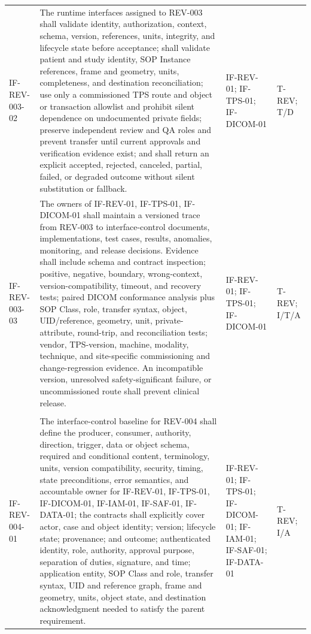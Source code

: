 \documentclass[11pt,letterpaper]{article}
\begin{document}
\begin{scriptsize}
\begin{longtable}{@{}L{0.14\textwidth}L{0.49\textwidth}L{0.19\textwidth}L{0.10\textwidth}@{}}
\addlinespace[2pt]
\mbox{IF-REV-003-02} & The runtime interfaces assigned to REV-003 shall validate identity, authorization, context, schema, version, references, units, integrity, and lifecycle state before acceptance; shall validate patient and study identity, SOP Instance references, frame and geometry, units, completeness, and destination reconciliation; use only a commissioned TPS route and object or transaction allowlist and prohibit silent dependence on undocumented private fields; preserve independent review and QA roles and prevent transfer until current approvals and verification evidence exist; and shall return an explicit accepted, rejected, canceled, partial, failed, or degraded outcome without silent substitution or fallback. & IF-REV-01; IF-TPS-01; IF-DICOM-01 & T-REV; T\slash\allowbreak{}D \\
\addlinespace[2pt]
\mbox{IF-REV-003-03} & The owners of IF-REV-01, IF-TPS-01, IF-DICOM-01 shall maintain a versioned trace from REV-003 to interface-control documents, implementations, test cases, results, anomalies, monitoring, and release decisions. Evidence shall include schema and contract inspection; positive, negative, boundary, wrong-context, version-compatibility, timeout, and recovery tests; paired DICOM conformance analysis plus SOP Class, role, transfer syntax, object, UID\slash\allowbreak{}reference, geometry, unit, private-attribute, round-trip, and reconciliation tests; vendor, TPS-version, machine, modality, technique, and site-specific commissioning and change-regression evidence. An incompatible version, unresolved safety-significant failure, or uncommissioned route shall prevent clinical release. & IF-REV-01; IF-TPS-01; IF-DICOM-01 & T-REV; I\slash\allowbreak{}T\slash\allowbreak{}A \\
\addlinespace[2pt]
 \\
\addlinespace[2pt]
\mbox{IF-REV-004-01} & The interface-control baseline for REV-004 shall define the producer, consumer, authority, direction, trigger, data or object schema, required and conditional content, terminology, units, version compatibility, security, timing, state preconditions, error semantics, and accountable owner for IF-REV-01, IF-TPS-01, IF-DICOM-01, IF-IAM-01, IF-SAF-01, IF-DATA-01; the contracts shall explicitly cover actor, case and object identity; version; lifecycle state; provenance; and outcome; authenticated identity, role, authority, approval purpose, separation of duties, signature, and time; application entity, SOP Class and role, transfer syntax, UID and reference graph, frame and geometry, units, object state, and destination acknowledgment needed to satisfy the parent requirement. & IF-REV-01; IF-TPS-01; IF-DICOM-01; IF-IAM-01; IF-SAF-01; IF-DATA-01 & T-REV; I\slash\allowbreak{}A \\

\end{longtable}
\end{scriptsize}
\end{document}
